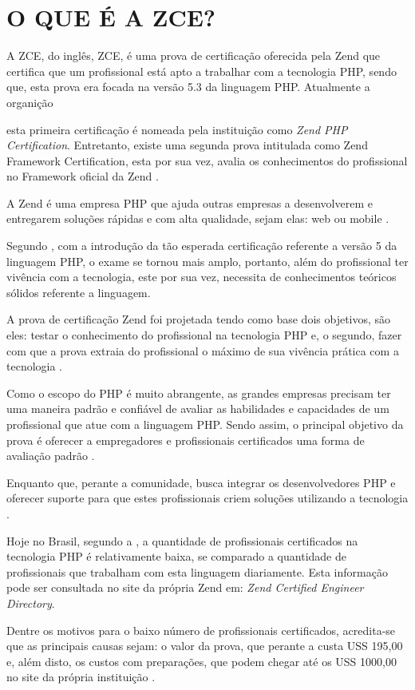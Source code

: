 \chapter{O QUE É A ZCE?}
\label{zce}

A \acs{ZCE}, do inglês, \acl{ZCE}, é uma prova de certificação oferecida
pela Zend que certifica que um profissional está apto a trabalhar com a
tecnologia \acs{PHP}, sendo que, esta prova era focada na versão 5.3 da
linguagem \acs{PHP}. Atualmente a organição 

esta primeira certificação é nomeada
pela instituição como \textit{Zend PHP Certification}. Entretanto, existe uma segunda prova intitulada como Zend Framework Certification, esta por sua vez, avalia os conhecimentos do profissional 
no Framework oficial da Zend \cite{websiteZendZce}. 

A Zend é uma empresa PHP que ajuda outras empresas a desenvolverem e entregarem
soluções rápidas e com alta qualidade, sejam elas: web ou mobile \cite{websiteZendCompany}.

Segundo , com a introdução da tão
esperada certificação referente a versão 5 da linguagem \acs{PHP}, o exame se
tornou mais amplo, portanto, além do profissional ter vivência com a
tecnologia, este por sua vez, necessita de conhecimentos teóricos sólidos
referente a linguagem.

A prova de certificação Zend foi projetada tendo como base dois objetivos, são
eles: testar o conhecimento do profissional na tecnologia PHP e, o segundo, fazer 
com que a prova extraia do profissional o máximo de sua vivência prática com a 
tecnologia \cite{theZendPHPCertificationPracticeTestBook}.

Como o escopo do PHP é muito abrangente, as grandes empresas precisam ter uma
maneira padrão e confiável de avaliar as habilidades e capacidades de um profissional 
que atue com a linguagem PHP. Sendo assim, o principal objetivo da prova é oferecer a 
empregadores e profissionais certificados uma forma de avaliação padrão
\cite{zendPhp5CertificationStudyGuide}.


Enquanto que, perante a comunidade, busca integrar os desenvolvedores PHP e
oferecer suporte para que estes profissionais criem soluções utilizando a tecnologia \cite{websiteZendCompany}.

Hoje no Brasil, segundo a , a quantidade de profissionais
certificados na tecnologia PHP é relativamente baixa, se comparado a quantidade 
de profissionais que trabalham com esta linguagem diariamente. Esta informação 
pode ser consultada no site da própria Zend em: \textit{Zend Certified Engineer
Directory}.

Dentre os motivos para o baixo número de profissionais certificados, acredita-se
que as principais causas sejam: o valor da prova, que perante a 
 custa USS 195,00 e, além disto, os custos com preparações, que podem chegar até
 os USS 1000,00 no site da própria instituição \cite{websiteZendOnlineTraining}.
